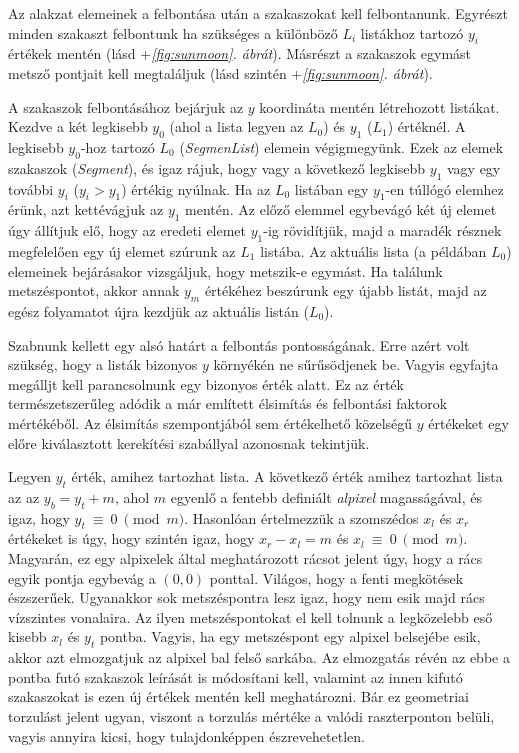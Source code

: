 \documentclass[12pt]{report}
\theoremstyle{definition}
\newcommand{\func}[1]{{\textsl{#1}}}
\begin{document}
Az alakzat elemeinek a felbontása után a szakaszokat kell felbontanunk. Egyrészt
minden szakaszt felbontunk ha szükséges a különböző $L_i$ listákhoz tartozó
$y_i$ értékek mentén (lásd \az+\emph{\ref{fig:sunmoon}. ábrát}). Másrészt a szakaszok
egymást metsző pontjait kell megtaláljuk (lásd szintén \az+\emph{\ref{fig:sunmoon}.
ábrát}).

A szakaszok felbontásához bejárjuk az $y$ koordináta mentén létrehozott
listákat. Kezdve a két legkisebb $y_0$ (ahol a lista legyen az $L_0$) és $y_1$
($L_1$) értéknél. A legkisebb $y_0$-hoz tartozó $L_0$ (\func{SegmenList})
elemein végigmegyünk. Ezek az elemek szakaszok (\func{Segment}), és igaz rájuk,
hogy vagy a következő legkisebb $y_1$ vagy egy további $y_i$ ($y_i > y_1$)
értékig nyúlnak. Ha az $L_0$ listában egy $y_1$-en túllógó elemhez érünk, azt
kettévágjuk az $y_1$ mentén. Az előző elemmel egybevágó két új elemet úgy
állítjuk elő, hogy az eredeti elemet $y_1$-ig rövidítjük, majd a maradék
résznek megfelelően egy új elemet szúrunk az $L_1$ listába. Az aktuális lista
(a példában $L_0$) elemeinek bejárásakor vizsgáljuk, hogy metszik-e egymást. Ha
találunk metszéspontot, akkor annak $y_m$ értékéhez beszúrunk egy újabb listát,
majd az egész folyamatot újra kezdjük az aktuális listán ($L_0$).

Szabnunk kellett egy alsó határt a felbontás pontosságának. Erre azért volt
szükség, hogy a listák bizonyos $y$ környékén ne sűrűsödjenek be. Vagyis
egyfajta megálljt kell parancsolnunk egy bizonyos érték alatt. Ez az érték
természetszerűleg adódik a már említett élsimítás és felbontási faktorok
mértékéből. Az élsimítás szempontjából sem értékelhető közelségű $y$ értékeket
egy előre kiválasztott kerekítési szabállyal azonosnak tekintjük.

Legyen $y_t$ érték, amihez tartozhat lista. A következő érték amihez tartozhat
lista az az $y_b = y_t + m$, ahol $m$ egyenlő a fentebb definiált
\emph{alpixel} magasságával, és igaz, hogy $y_t~\equiv~0~\pmod{m}$. Hasonlóan
értelmezzük a szomszédos $x_l$ és $x_r$ értékeket is úgy, hogy szintén igaz,
hogy $x_r - x_l = m$ és $x_l~\equiv~0~\pmod{m}$. Magyarán, ez egy alpixelek
által meghatározott rácsot jelent úgy, hogy a rács egyik pontja egybevág a $(0,
0)$ ponttal. Világos, hogy a fenti megkötések észszerűek. Ugyanakkor sok
metszéspontra lesz igaz, hogy nem esik majd rács vízszintes vonalaira. Az ilyen
metszéspontokat el kell tolnunk a legközelebb eső kisebb $x_l$ és $y_t$ pontba.
Vagyis, ha egy metszéspont egy alpixel belsejébe esik, akkor azt elmozgatjuk az
alpixel bal felső sarkába. Az elmozgatás révén az ebbe a pontba futó szakaszok
leírását is módosítani kell, valamint az innen kifutó szakaszokat is ezen új
értékek mentén kell meghatározni. Bár ez geometriai torzulást jelent ugyan,
viszont a torzulás mértéke a valódi raszterponton belüli, vagyis annyira kicsi,
hogy tulajdonképpen észrevehetetlen.
\end{document}

